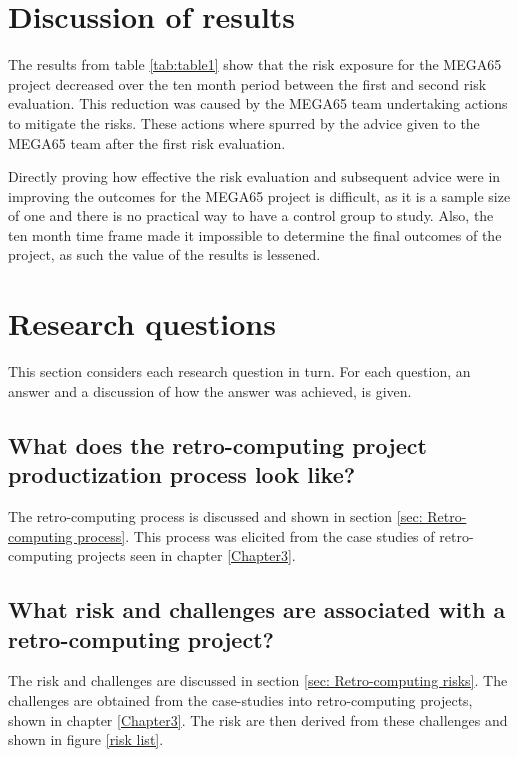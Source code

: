 \section{Discussion of results}
The results from table \ref{tab:table1} show that the risk exposure for the MEGA65 project decreased over the ten month period between the first and second risk evaluation. This reduction was caused by the MEGA65 team undertaking actions to mitigate the risks. These actions where spurred by the advice given to the MEGA65 team after the first risk evaluation. 

Directly proving how effective the risk evaluation and subsequent advice were in improving the outcomes for the MEGA65 project is difficult, as it is a sample size of one and there is no practical way to have a control group to study. Also, the ten month time frame made it impossible to determine the final outcomes of the project, as such the value of the results is lessened.

\section{Research questions}
This section considers each research question in turn. For each question, an answer and a discussion of how the answer was achieved, is given.

\subsection{What does the retro-computing project productization process look like?}
The retro-computing process is discussed and shown in section \ref{sec: Retro-computing process}. This process was elicited from the case studies of retro-computing projects seen in chapter \ref{Chapter3}. 

\subsection{What risk and challenges are associated with a retro-computing project?}
The risk and challenges are discussed in section \ref{sec: Retro-computing risks}. The challenges are obtained from the case-studies into retro-computing projects, shown in chapter \ref{Chapter3}. The risk are then derived from these challenges and shown in figure \ref{risk list}.

